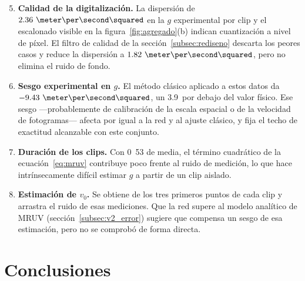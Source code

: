 \documentclass[titlepage,11pt]{article}
\providecommand{\num}[1]{\ensuremath{#1}}
\providecommand{\SI}[2]{#1\,#2}
\providecommand{\percent}{\char37\relax}
\begin{document}
\begin{enumerate}
\setcounter{enumi}{4}
\item \textbf{Calidad de la digitalización.} La dispersión de
  $\num{2.36}~\meter\per\second\squared$ en la $g$ experimental por clip y el
  escalonado visible en la figura~\ref{fig:agregado}(b) indican cuantización a
  nivel de píxel. El filtro de calidad de la sección~\ref{subsec:rediseno}
  descarta los peores casos y reduce la dispersión a
  $\num{1.82}~\meter\per\second\squared$, pero no elimina el ruido de fondo.

\item \textbf{Sesgo experimental en $g$.} El método clásico aplicado a estos
  datos da $\num{-9.43}~\meter\per\second\squared$, un \SI{3.9}{\percent} por
  debajo del valor físico. Ese sesgo ---probablemente de calibración de la
  escala espacial o de la velocidad de fotogramas--- afecta por igual a la red
  y al ajuste clásico, y fija el techo de exactitud alcanzable con este
  conjunto.

\item \textbf{Duración de los clips.} Con \unit{0.53}{\second} de media, el
  término cuadrático de la ecuación~\eqref{eq:mruv} contribuye poco frente al
  ruido de medición, lo que hace intrínsecamente difícil estimar $g$ a partir
  de un clip aislado.

\item \textbf{Estimación de $v_0$.} Se obtiene de los tres primeros puntos de
  cada clip y arrastra el ruido de esas mediciones. Que la red supere al modelo
  analítico de MRUV (sección~\ref{subsec:v2_error}) sugiere que compensa un
  sesgo de esa estimación, pero no se comprobó de forma directa.
\end{enumerate}


\section{Conclusiones}
\label{sec:conclusiones}
\end{document}
